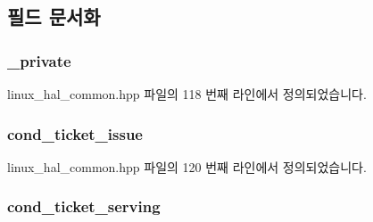 \subsection{필드 문서화}
\subsubsection[{\texorpdfstring{\+\_\+private}{_private}}]{ \+\_\+private\hspace{0.3cm}{\ttfamily [private]}}\hypertarget{class_ticketing_lock_a351c5faad8218bb8571b5d784b7f364f}{}\label{class_ticketing_lock_a351c5faad8218bb8571b5d784b7f364f}


linux\+\_\+hal\+\_\+common.\+hpp 파일의 118 번째 라인에서 정의되었습니다.

\subsubsection[{\texorpdfstring{cond\+\_\+ticket\+\_\+issue}{cond_ticket_issue}}]{ cond\+\_\+ticket\+\_\+issue\hspace{0.3cm}{\ttfamily [private]}}\hypertarget{class_ticketing_lock_a8b7a3b091ea1d5901833b1b38d7d5338}{}\label{class_ticketing_lock_a8b7a3b091ea1d5901833b1b38d7d5338}


linux\+\_\+hal\+\_\+common.\+hpp 파일의 120 번째 라인에서 정의되었습니다.

\subsubsection[{\texorpdfstring{cond\+\_\+ticket\+\_\+serving}{cond_ticket_serving}}]{ cond\+\_\+ticket\+\_\+serving\hspace{0.3cm}{\ttfamily [private]}}\hypertarget{class_ticketing_lock_a4ee669f5608abcc6ffdfc0f5df01e6cf}{}\label{class_ticketing_lock_a4ee669f5608abcc6ffdfc0f5df01e6cf}


